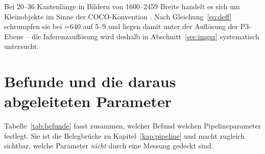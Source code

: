 Bei 20--36\px{} Kantenlänge in Bildern von 1600--2459\px{} Breite handelt es sich
um Kleinobjekte im Sinne der COCO-Konvention \parencite{lin2014coco}. Nach
Gleichung~\eqref{eq:deff} schrumpfen sie bei =640 auf 5--9\px{} und
liegen damit unter der Auflösung der P3-Ebene -- die Inferenzauflösung wird
deshalb in Abschnitt~\ref{sec:imgsz} systematisch untersucht.

\section{Befunde und die daraus abgeleiteten Parameter}
\label{sec:messungmapping}

Tabelle~\ref{tab:befunde} fasst zusammen, welcher Befund welchen
Pipelineparameter festlegt. Sie ist die Belegbrücke zu
Kapitel~\ref{kap:pipeline} und macht zugleich sichtbar, welche Parameter
\emph{nicht} durch eine Messung gedeckt sind.

